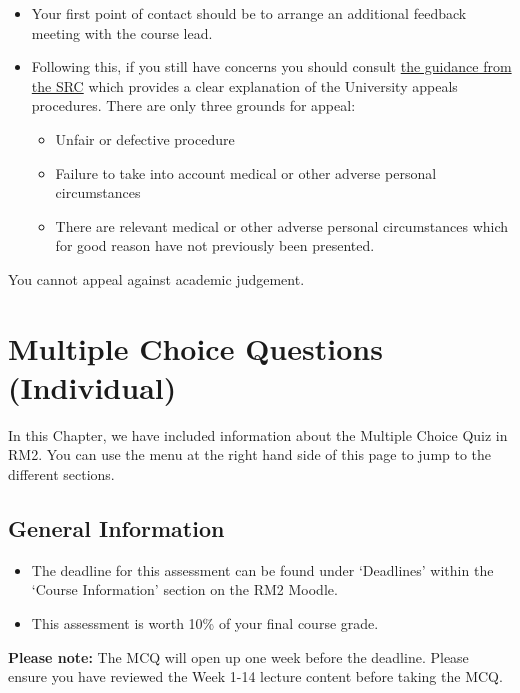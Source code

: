 \documentclass[
  english,
  letterpaper,
  DIV=11,
  numbers=noendperiod]{scrreprt}
\providecommand{\tightlist}{%
  \setlength{\itemsep}{0pt}\setlength{\parskip}{0pt}}
\begin{document}
\begin{itemize}
\item
  Your first point of contact should be to arrange an additional
  feedback meeting with the course lead.
\item
  Following this, if you still have concerns you should consult
  \href{https://www.glasgowunisrc.org/advice/academic/appeals/}{the
  guidance from the SRC} which provides a clear explanation of the
  University appeals procedures. There are only three grounds for
  appeal:

  \begin{itemize}
  \tightlist
  \item
    Unfair or defective procedure
  \item
    Failure to take into account medical or other adverse personal
    circumstances
  \item
    There are relevant medical or other adverse personal circumstances
    which for good reason have not previously been presented.
  \end{itemize}
\end{itemize}

You cannot appeal against academic judgement.

\chapter{Multiple Choice Questions (Individual)}\label{ch2_mcqs}

In this Chapter, we have included information about the Multiple Choice
Quiz in RM2. You can use the menu at the right hand side of this page to
jump to the different sections.

\section{General Information}\label{general-information-1}

\begin{itemize}
\item
  The deadline for this assessment can be found under `Deadlines' within
  the `Course Information' section on the RM2 Moodle.
\item
  This assessment is worth 10\% of your final course grade.
\end{itemize}

\textbf{Please note:} The MCQ will open up one week before the deadline.
Please ensure you have reviewed the Week 1-14 lecture content before
taking the MCQ.
\end{document}

